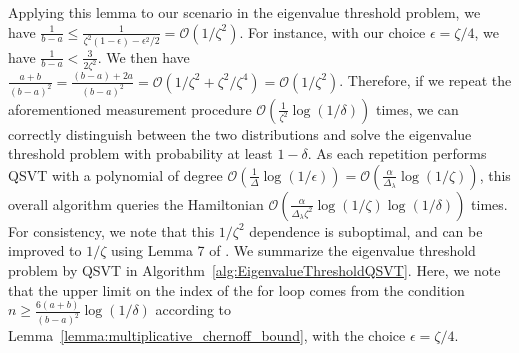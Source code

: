 \documentclass[aps,pra,showpacs,notitlepage,twocolumn,superscriptaddress,nofootinbib]{revtex4-1}
\begin{document}
    Applying this lemma to our scenario in the eigenvalue threshold problem, we have $\frac{1}{b-a} \leq \frac{1}{\zeta^2(1-\epsilon)-\epsilon^2/2}=\mathcal{O}(1/\zeta^2)$. For instance, with our choice $\epsilon = \zeta/4$, we have $\frac{1}{b-a} < \frac{3}{2\zeta^2}$. We then have $\frac{a+b}{(b-a)^2} = \frac{(b-a)+2a}{(b-a)^2} = \mathcal{O}(1/\zeta^2+\zeta^2/\zeta^4) = \mathcal{O}(1/\zeta^2)$. Therefore, if we repeat the aforementioned measurement procedure $\mathcal{O}\left(\frac{1}{\zeta^2} \log(1/\delta)\right)$ times, we can correctly distinguish between the two distributions and solve the eigenvalue threshold problem with probability at least $1-\delta$. As each repetition performs QSVT with a polynomial of degree $\mathcal{O}\left(\frac{1}{\Delta} \log(1/\epsilon)\right) = \mathcal{O}\left(\frac{\alpha}{\Delta_\lambda} \log(1/\zeta)\right)$, this overall algorithm queries the Hamiltonian $\mathcal{O}\left(\frac{\alpha}{\Delta_\lambda \zeta^2}\log(1/\zeta)\log(1/\delta)\right)$ times. For consistency, we note that this $1/\zeta^2$ dependence is suboptimal, and can be improved to $1/\zeta$ using Lemma 7 of \cite{Lin_2020_2}. We summarize the eigenvalue threshold problem by QSVT in Algorithm~\ref{alg:EigenvalueThresholdQSVT}. Here, we note that the upper limit on the index of the for loop comes from the condition $n \geq \frac{6(a+b)}{(b - a)^2}\log(1/\delta)$ according to Lemma~\ref{lemma:multiplicative_chernoff_bound}, with the choice $\epsilon=\zeta/4$.
    
\end{document}
